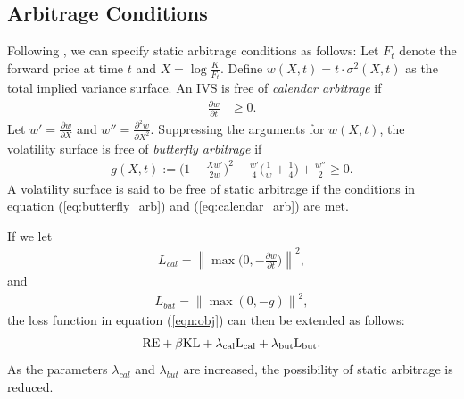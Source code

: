 \documentclass[12pt]{article}
\newcommand{\norm}[1]{\left\lVert#1\right\rVert}
\begin{document}
\printbibliography
\newpage
\appendix
\begin{appendices}
\section{Arbitrage Conditions}\label{app:arb}
Following \citet{ssvi}, we can specify static arbitrage conditions as follows:
Let $F_t$ denote the forward price at time $t$ and $X=\log{\frac{K}{F_t}}$. Define $w(X, t)=t\cdot\sigma^2(X,t)$ as the total implied variance surface. An IVS is free of \textit{calendar arbitrage} if 
\begin{align}\label{eq:calendar_arb}
  \frac{\partial w}{\partial t} & \geq 0.
\end{align}
Let $w'=\frac{\partial w}{\partial X}$ and $w''=\frac{\partial^2 w}{\partial X^2}$. Suppressing the arguments for $w(X,t)$,  the volatility surface is free of \textit{butterfly arbitrage} if 
\begin{align}
  \label{eq:butterfly_arb}
  g(X, t) := \Big(1-\frac{X w'}{2w}\Big)^2 -
  \frac{w'}{4} \Big(\frac{1}{w}
  + \frac{1}{4}\Big) + \frac{w''}{2} \geq 0.
\end{align}
A volatility surface is said to be free of static arbitrage if the conditions in equation (\ref{eq:butterfly_arb}) and (\ref{eq:calendar_arb}) are met.

If we let  
\begin{align}
\label{eq:cal_loss}
  L_{cal} = \norm{\max\Big(0, -\frac{\partial w}{\partial t}\Big)}^2,
\end{align}
and 
\begin{align}
\label{eq:butt_loss}
  L_{but} = \norm{\max(0, -g)}^2,
\end{align}
the loss function in equation (\ref{eqn:obj}) can then be extended as follows:
\begin{align}
\label{eq:arb_loss}
  \rm{RE} + \beta\rm{KL} + \lambda_{cal} L_{cal} + \lambda_{but} L_{but}.
\end{align}
As the parameters $\lambda_{cal}$ and $\lambda_{but}$ are increased, the possibility of
static arbitrage is reduced. 
\pagebreak


\end{appendices}
\end{document}
